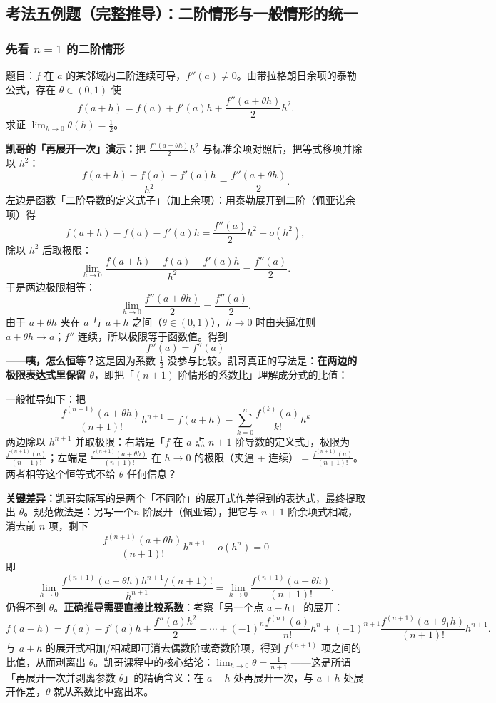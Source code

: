 \documentclass[a4paper]{article}
\begin{document}
\subsection{考法五例题（完整推导）：二阶情形与一般情形的统一}

\subsubsection{先看 $n=1$ 的二阶情形}

题目：$f$ 在 $a$ 的某邻域内二阶连续可导，$f''(a)\neq 0$。由带拉格朗日余项的泰勒公式，存在 $\theta\in(0,1)$ 使
\[
f(a+h)=f(a)+f'(a)h+\frac{f''(a+\theta h)}{2}h^{2}.
\]
求证 $\lim_{h\to0}\theta(h)=\frac12$。

\textbf{凯哥的「再展开一次」演示：}把 $\frac{f''(a+\theta h)}2h^2$ 与标准余项对照后，把等式移项并除以 $h^2$：
\[
\frac{f(a+h)-f(a)-f'(a)h}{h^2}=\frac{f''(a+\theta h)}{2}.
\]
左边是函数「二阶导数的定义式子」（加上余项）：用泰勒展开到二阶（佩亚诺余项）得
\[
f(a+h)-f(a)-f'(a)h=\frac{f''(a)}{2}h^2+o(h^2),
\]
除以 $h^2$ 后取极限：
\[
\lim_{h\to0}\frac{f(a+h)-f(a)-f'(a)h}{h^2}=\frac{f''(a)}2.
\]
于是两边极限相等：
\[
\lim_{h\to0}\frac{f''(a+\theta h)}2=\frac{f''(a)}2 .
\]
由于 $a+\theta h$ 夹在 $a$ 与 $a+h$ 之间（$\theta\in(0,1)$），$h\to0$ 时由夹逼准则 $a+\theta h\to a$；$f''$ 连续，所以极限等于函数值。得到
\[
f''(a)=f''(a)
\]
——\textbf{咦，怎么恒等？}这是因为系数 $\frac12$ 没参与比较。凯哥真正的写法是：\textbf{在两边的极限表达式里保留 $\theta$}，即把「$(n+1)$ 阶情形的系数比」理解成分式的比值：

一般推导如下：把
\[
\frac{f^{(n+1)}(a+\theta h)}{(n+1)!}h^{n+1}=f(a+h)-\sum_{k=0}^{n}\frac{f^{(k)}(a)}{k!}h^{k}
\]
两边除以 $h^{n+1}$ 并取极限：右端是「$f$ 在 $a$ 点 $n+1$ 阶导数的定义式」，极限为 $\frac{f^{(n+1)}(a)}{(n+1)!}$；左端是 $\frac{f^{(n+1)}(a+\theta h)}{(n+1)!}$ 在 $h\to0$ 的极限（夹逼 + 连续）$=\frac{f^{(n+1)}(a)}{(n+1)!}$。两者相等这个恒等式不给 $\theta$ 任何信息？

\textbf{关键差异：}凯哥实际写的是两个「不同阶」的展开式作差得到的表达式，最终提取出 $\theta$。规范做法是：另写一个$n$ 阶展开（佩亚诺），把它与 $n+1$ 阶余项式相减，消去前 $n$ 项，剩下\[
\frac{f^{(n+1)}(a+\theta h)}{(n+1)!}h^{n+1}-o(h^{n})=0
\]
即
\[
\lim_{h\to0}\frac{f^{(n+1)}(a+\theta h) h^{n+1}/(n+1)!}{h^{n+1}} = \lim_{h\to0}\frac{f^{(n+1)}(a+\theta h)}{(n+1)!}.
\]
仍得不到 $\theta$。\textbf{正确推导需要直接比较系数}：考察「另一个点 $a-h$」 的展开：
\[
f(a-h)=f(a)-f'(a)h+\frac{f''(a)h^2}{2}-\cdots+(-1)^{n}\frac{f^{(n)}(a)}{n!}h^{n}+(-1)^{n+1}\frac{f^{(n+1)}(a+\theta_{1}h)}{(n+1)!}h^{n+1}.
\]
与 $a+h$ 的展开式相加/相减即可消去偶数阶或奇数阶项，得到 $f^{(n+1)}$ 项之间的比值，从而剥离出 $\theta$。凯哥课程中的核心结论：\textbf{$\lim_{h\to0}\theta=\frac{1}{n+1}$ }——这是所谓「再展开一次并剥离参数 $\theta$」的精确含义：在 $a-h$ 处再展开一次，与 $a+h$ 处展开作差，$\theta$ 就从系数比中露出来。
\end{document}
